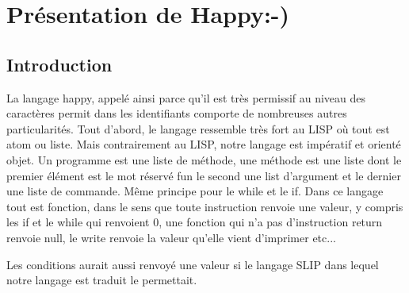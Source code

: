 \chapter{Présentation de Happy:-)}
\section{Introduction}
La langage happy, appelé ainsi parce qu'il est très permissif au niveau des caractères permit dans les identifiants comporte de nombreuses autres particularités. Tout d'abord, le langage ressemble très fort au LISP où tout est atom ou liste.
Mais contrairement au LISP, notre langage est impératif et orienté objet. Un programme est une liste de méthode, une méthode est une liste dont le premier élément est le mot réservé fun le second une list d'argument et le dernier une liste de commande. Même principe pour le while et le if. Dans ce langage tout est fonction, dans le sens que toute instruction renvoie une valeur, y compris les if et le while qui renvoient 0, une fonction qui n'a pas d'instruction return renvoie null, le write renvoie la valeur qu'elle vient d'imprimer etc...



Les conditions aurait aussi renvoyé une valeur si le langage SLIP dans lequel notre langage est traduit le permettait. 

